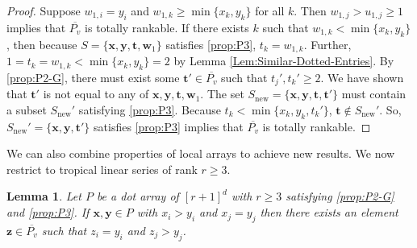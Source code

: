 \documentclass{amsart}
\newtheorem{lemma}[theorem]{Lemma}
\begin{document}
\begin{proof}
		Suppose $w_{1,i} = y_i$ and $w_{1,k} \geq \min \{ x_k, y_k \}$ for all $k$. Then $w_{1,j} > u_{1,j} \geq 1$ implies that $\overline{P_v}$ is totally rankable. If there exists $k$ such that $w_{1,k} < \min \{ x_k, y_k \}$, then because $S = \{ \mathbf{x}, \mathbf{y}, \mathbf{t}, \mathbf{w}_1 \}$ satisfies \ref{prop:P3}, $t_k = w_{1,k}$. Further, $1 = t_k = w_{1,k} < \min \{ x_k, y_k \} = 2$ by Lemma \ref{Lem:Similar-Dotted-Entries}. By \ref{prop:P2-G}, there must exist some $\mathbf{t}' \in \overline{P_v}$ such that $t_j', t_k' \geq 2$. We have shown that $\mathbf{t}'$ is not equal to any of $\mathbf{x}, \mathbf{y}, \mathbf{t}, \mathbf{w}_1$. The set $S_{\text{new}} = \{ \mathbf{x}, \mathbf{y}, \mathbf{t}, \mathbf{t}' \}$ must contain a subset $S_{\text{new}}'$ satisfying \ref{prop:P3}. Because $t_k < \min \{ x_k, y_k, t_k' \}$, $\mathbf{t} \not \in S_{\text{new}}'$. So, $S_{\text{new}}' = \{ \mathbf{x}, \mathbf{y}, \mathbf{t}' \}$ satisfies \ref{prop:P3} implies that $\overline{P_v}$ is totally rankable.
	\end{proof}
	
	We can also combine properties of local arrays to achieve new results. We now restrict to tropical linear series of rank $r \geq 3$.
	
	\begin{lemma}
		\label{Lem:tls-local-arrays-nearly-totally-rankable}
		Let $P$ be a dot array of $[r+1]^d$ with $r \geq 3$ satisfying \ref{prop:P2-G} and \ref{prop:P3}. If $\mathbf{x}, \mathbf{y} \in P$ with $x_i > y_i$ and $x_j = y_j$ then there exists an element $\mathbf{z} \in \overline{P_v}$ such that $z_i = y_i$ and $z_j > y_j$.
	\end{lemma}
	
\end{document}
